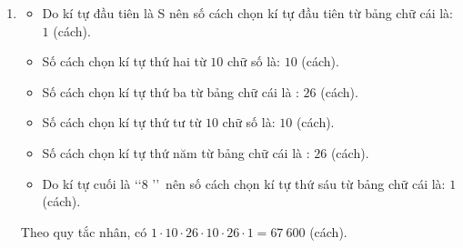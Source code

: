 \begin{bt}
{\begin{enumerate}
\begin{itemize}
				\item Số cách chọn kí tự thứ sáu từ $ 10  $ chữ số là: $ 10 $ (cách).
			\end{itemize}
			Theo quy tắc nhân, có $1\cdot 10\cdot 26\cdot 10\cdot 26\cdot 10=676~000$ (cách).
			\item 
			\begin{itemize}
				\item  Do kí tự đầu tiên là S nên số cách chọn kí tự đầu tiên từ bảng chữ cái là: $ 1 $ (cách).
				\item  Số cách chọn kí tự thứ hai từ $ 10  $ chữ số là: $ 10 $ (cách).
				\item  Số cách chọn kí tự thứ ba từ bảng chữ cái là : $ 26 $ (cách).
				\item  Số cách chọn kí tự thứ tư từ $ 10  $ chữ số là: $ 10 $ (cách).
				\item  Số cách chọn kí tự thứ năm từ bảng chữ cái là : $ 26 $ (cách).
				\item  Do kí tự cuối là \lq\lq 8 \rq\rq \, nên số cách chọn kí tự thứ sáu từ bảng chữ cái là: $ 1 $ (cách).
			\end{itemize}
			Theo quy tắc nhân, có $1\cdot 10\cdot 26\cdot 10\cdot 26\cdot 1=67~600$ (cách).
		\end{enumerate}
	}
\end{bt}

